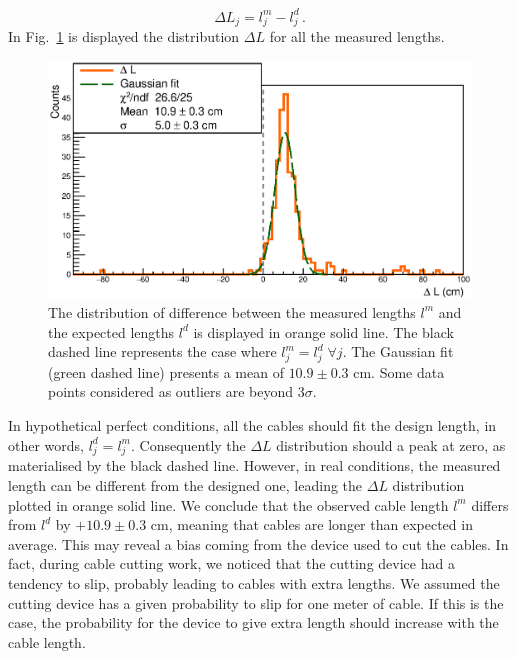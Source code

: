 \begin{equation}
  \Delta L_{j} = l^{m}_{j}-l^{d}_{j}\, .
\end{equation}
In Fig.~\ref{fig:LengthDiff} is displayed the distribution $\Delta L$ for all the measured lengths.
\begin{figure}[h!]
  \centering
  \includegraphics[width=15cm]{commissioning/fig_commissioning/length_diff.eps}

  \caption{The distribution of difference between the measured lengths $l^{m}$ and the expected lengths $l^{d}$ is displayed in orange solid line.
    The black dashed line represents the case where $l^{m}_{j} = l^{d}_{j} \;\forall j$.
    The Gaussian fit (green dashed line) presents a mean of $10.9 \pm 0.3$ cm.
    Some data points considered as outliers are beyond $3\sigma$.
    \label{fig:LengthDiff}}
\end{figure}
In hypothetical perfect conditions, all the cables should fit the design length, in other words, $l^{d}_{j} = l^{m}_{j}$.
Consequently the $\Delta L$ distribution should a peak at zero, as materialised by the black dashed line.
However, in real conditions, the measured length can be different from the designed one, leading the $\Delta L$ distribution plotted in orange solid line.
We conclude that the observed cable length $l^{m}$ differs from $l^{d}$ by $+10.9\pm 0.3$ cm, meaning that cables are longer than expected in average.
This may reveal a bias coming from the device used to cut the cables.
In fact, during cable cutting work, we noticed that the cutting device had a tendency to slip, probably leading to cables with extra lengths.
We assumed the cutting device has a given probability to slip for one meter of cable.
If this is the case, the probability for the device to give extra length should increase with the cable length.

